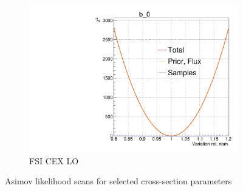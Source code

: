 \begin{figure}[h]
\begin{subfigure}[t]{0.32\textwidth}
		\includegraphics[width=\textwidth,page=104, trim={0mm 0mm 0mm 11mm}, clip]{figures/mach3/2018/llh/tryBinningNumber6_after_fit_asimov_asimov_ND280logL_scan}
		\caption{FSI CEX LO}
	\end{subfigure}
	\caption{Asimov likelihood scans for selected cross-section parameters}
	\label{fig:xsec_asimov_llh_2018}
\end{figure}

